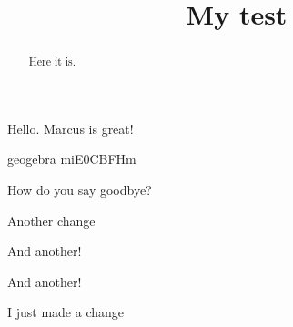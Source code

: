 \documentclass{ximera}
\title{My test}
\newcommand{\geogebra}[1][]{geogebra #1}
\begin{document}
\begin{abstract}
  Here it is.
\end{abstract}
\maketitle

Hello. Marcus is great!



\geogebra{miE0CBFHm}

\begin{multipleChoice}
  How do you say goodbye?
\end{multipleChoice}

Another change

And another!

And another!

I just made a change
\end{document}
